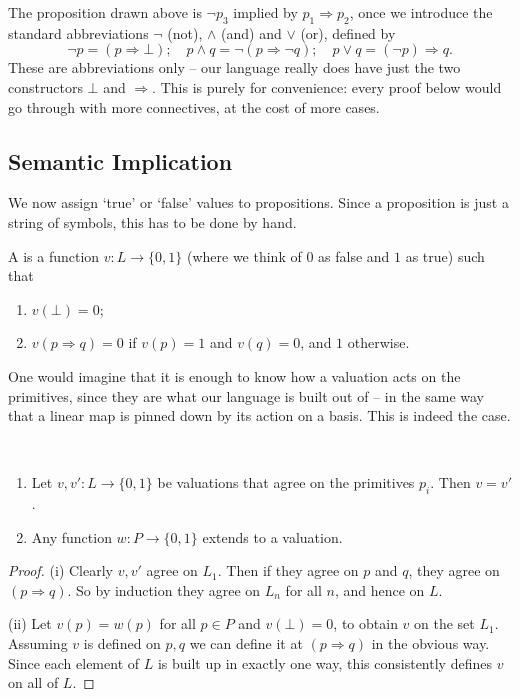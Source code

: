 \documentclass[a4paper]{scrartcl}
\begin{document}
The proposition drawn above is $\lnot p_3$ implied by $p_1 \Rightarrow p_2$, once we introduce the standard abbreviations $\lnot$ (not), $\land$ (and) and $\lor$ (or), defined by
$$
\lnot p = (p \Rightarrow \bot); \quad p \land q = \lnot(p \Rightarrow \lnot q); \quad p \lor q = (\lnot p) \Rightarrow q.
$$
These are abbreviations only -- our language really does have just the two constructors $\bot$ and $\Rightarrow$. This is purely for convenience: every proof below would go through with more connectives, at the cost of more cases.

\subsection{Semantic Implication}

We now assign `true' or `false' values to propositions. Since a proposition is just a string of symbols, this has to be done by hand.

\begin{definition}[Valuation]
  A  is a function $v : L \rightarrow \{0, 1\}$ (where we think of $0$ as false and $1$ as true) such that
  \begin{enumerate}[label=(\roman*)]
    \item $v(\bot) = 0$;
    \item $v(p \Rightarrow q) = 0$ if $v(p) = 1$ and $v(q) = 0$, and $1$ otherwise.
  \end{enumerate}
\end{definition}

One would imagine that it is enough to know how a valuation acts on the primitives, since they are what our language is built out of -- in the same way that a linear map is pinned down by its action on a basis. This is indeed the case.

\begin{proposition}~
  \begin{enumerate}[label=(\roman*)]
    \item Let $v, v' : L \rightarrow \{0, 1\}$ be valuations that agree on the primitives $p_i$. Then $v = v'$.
    \item Any function $w: P \rightarrow \{0, 1\}$ extends to a valuation.
  \end{enumerate}
\end{proposition}
\begin{proof}
  (i) Clearly $v, v'$ agree on $L_1$. Then if they agree on $p$ and $q$, they agree on $(p \Rightarrow q)$. So by induction they agree on $L_n$ for all $n$, and hence on $L$.

  (ii) Let $v(p) = w(p)$ for all $p \in P$ and $v(\bot) = 0$, to obtain $v$ on the set $L_1$. Assuming $v$ is defined on $p, q$ we can define it at $(p\Rightarrow q)$ in the obvious way. Since each element of $L$ is built up in exactly one way, this consistently defines $v$ on all of $L$.
\end{proof}
\end{document}
